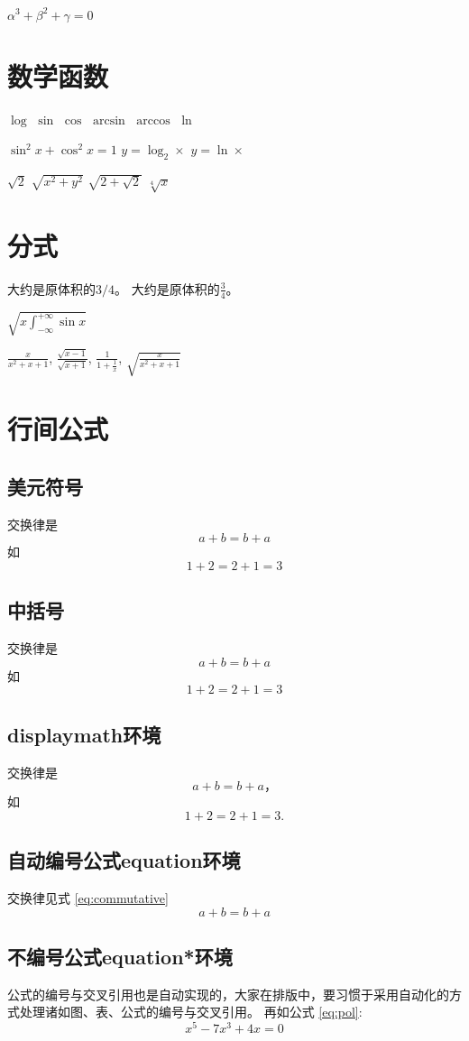 \documentclass{article}
\begin{document}
    $\alpha^3+ \beta^2 + \gamma=0$

    \section{数学函数}
    $\log$
    $\sin$
    $\cos$
    $\arcsin$
    $\arccos$
    $\ln$

    $\sin^2 x+ \cos^2 x=1$
    $y=\log_2×$
    $y=\ln ×$

    $\sqrt{2}$
    $\sqrt{x^2+y^2}$
    $\sqrt{2+ \sqrt{2}}$
    $\sqrt[4]{x}$
    \section{分式}
    大约是原体积的$3/4$。
    大约是原体积的$\frac{3}{4}$。 

    $\sqrt{x\int_{-\infty }^{+\infty } \sin x} $
    
    $\frac{x}{x^2+x+1}$,
    $\frac{\sqrt{x-1}}{\sqrt{x+1}}$,
    $\frac{1}{1+\frac{1}{x}}$,
    $\sqrt{\frac{x}{x^2+x+1}}$
    \section{行间公式}
    \subsection{美元符号}
    交换律是$$a+b=b+a$$如$$1+2=2+1=3$$
    \subsection{中括号}
    交换律是
    \[a+b=b+a\]
    如
    \[1+2=2+1=3\]
    \subsection{displaymath环境}
    交换律是
    \begin{displaymath}
        a+b=b+a，
    \end{displaymath}
    如
    \begin{displaymath}
        1+2=2+1=3.
    \end{displaymath}
    \subsection{自动编号公式equation环境}
    交换律见式 \ref{eq:commutative}
    \begin{equation}
        a+b=b+a \label{eq:commutative}
    \end{equation}
    \subsection{不编号公式equation*环境}
    公式的编号与交叉引用也是自动实现的，大家在排版中，要习惯于采用自动化的方式处理诸如图、表、公式的编号与交叉引用。
    再如公式 \ref{eq:pol}:
    \begin{equation}
        x^5-7x^3+4x=0 \label{eq:pol}
    \end{equation}
\end{document}

